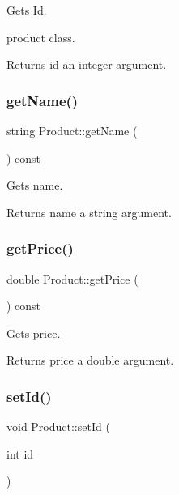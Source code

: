 Gets Id. 

product class.

\begin{DoxyReturn}{Returns}
id an integer argument. 
\end{DoxyReturn}
\mbox{\label{classProduct_add69128805228e23dcc6619b0a167a08}} 
\subsubsection{\texorpdfstring{get\+Name()}{getName()}}
{\footnotesize\ttfamily string Product\+::get\+Name (\begin{DoxyParamCaption}{ }\end{DoxyParamCaption}) const}



Gets name. 

\begin{DoxyReturn}{Returns}
name a string argument. 
\end{DoxyReturn}
\mbox{\label{classProduct_a3be25f647260d61df6063ef706261c7f}} 
\subsubsection{\texorpdfstring{get\+Price()}{getPrice()}}
{\footnotesize\ttfamily double Product\+::get\+Price (\begin{DoxyParamCaption}{ }\end{DoxyParamCaption}) const}



Gets price. 

\begin{DoxyReturn}{Returns}
price a double argument. 
\end{DoxyReturn}
\mbox{\label{classProduct_afeb389b5d13ac1e68bbdafe41c898689}} 
\subsubsection{\texorpdfstring{set\+Id()}{setId()}}
{\footnotesize\ttfamily void Product\+::set\+Id (\begin{DoxyParamCaption}\item[{int}]{id }\end{DoxyParamCaption})}



